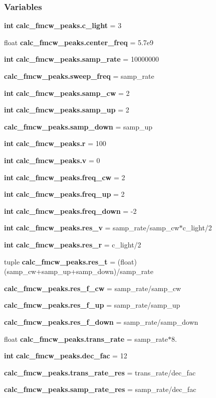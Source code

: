 \subsubsection*{Variables}
\begin{DoxyCompactItemize}
\item 
{\bf int} {\bf calc\+\_\+fmcw\+\_\+peaks.\+c\+\_\+light} = 3
\item 
float {\bf calc\+\_\+fmcw\+\_\+peaks.\+center\+\_\+freq} = 5.\+7e9
\item 
{\bf int} {\bf calc\+\_\+fmcw\+\_\+peaks.\+samp\+\_\+rate} = 10000000
\item 
{\bf calc\+\_\+fmcw\+\_\+peaks.\+sweep\+\_\+freq} = samp\+\_\+rate
\item 
{\bf int} {\bf calc\+\_\+fmcw\+\_\+peaks.\+samp\+\_\+cw} = 2
\item 
{\bf int} {\bf calc\+\_\+fmcw\+\_\+peaks.\+samp\+\_\+up} = 2
\item 
{\bf calc\+\_\+fmcw\+\_\+peaks.\+samp\+\_\+down} = samp\+\_\+up
\item 
{\bf int} {\bf calc\+\_\+fmcw\+\_\+peaks.\+r} = 100
\item 
{\bf int} {\bf calc\+\_\+fmcw\+\_\+peaks.\+v} = 0
\item 
{\bf int} {\bf calc\+\_\+fmcw\+\_\+peaks.\+freq\+\_\+cw} = 2
\item 
{\bf int} {\bf calc\+\_\+fmcw\+\_\+peaks.\+freq\+\_\+up} = 2
\item 
{\bf int} {\bf calc\+\_\+fmcw\+\_\+peaks.\+freq\+\_\+down} = -\/2
\item 
{\bf int} {\bf calc\+\_\+fmcw\+\_\+peaks.\+res\+\_\+v} = samp\+\_\+rate/samp\+\_\+cw$\ast$c\+\_\+light/2
\item 
{\bf int} {\bf calc\+\_\+fmcw\+\_\+peaks.\+res\+\_\+r} = c\+\_\+light/2
\item 
tuple {\bf calc\+\_\+fmcw\+\_\+peaks.\+res\+\_\+t} = (float)(samp\+\_\+cw+samp\+\_\+up+samp\+\_\+down)/samp\+\_\+rate
\item 
{\bf calc\+\_\+fmcw\+\_\+peaks.\+res\+\_\+f\+\_\+cw} = samp\+\_\+rate/samp\+\_\+cw
\item 
{\bf calc\+\_\+fmcw\+\_\+peaks.\+res\+\_\+f\+\_\+up} = samp\+\_\+rate/samp\+\_\+up
\item 
{\bf calc\+\_\+fmcw\+\_\+peaks.\+res\+\_\+f\+\_\+down} = samp\+\_\+rate/samp\+\_\+down
\item 
float {\bf calc\+\_\+fmcw\+\_\+peaks.\+trans\+\_\+rate} = samp\+\_\+rate$\ast$8.
\item 
{\bf int} {\bf calc\+\_\+fmcw\+\_\+peaks.\+dec\+\_\+fac} = 12
\item 
{\bf calc\+\_\+fmcw\+\_\+peaks.\+trans\+\_\+rate\+\_\+res} = trans\+\_\+rate/dec\+\_\+fac
\item 
{\bf calc\+\_\+fmcw\+\_\+peaks.\+samp\+\_\+rate\+\_\+res} = samp\+\_\+rate/dec\+\_\+fac
\end{DoxyCompactItemize}
